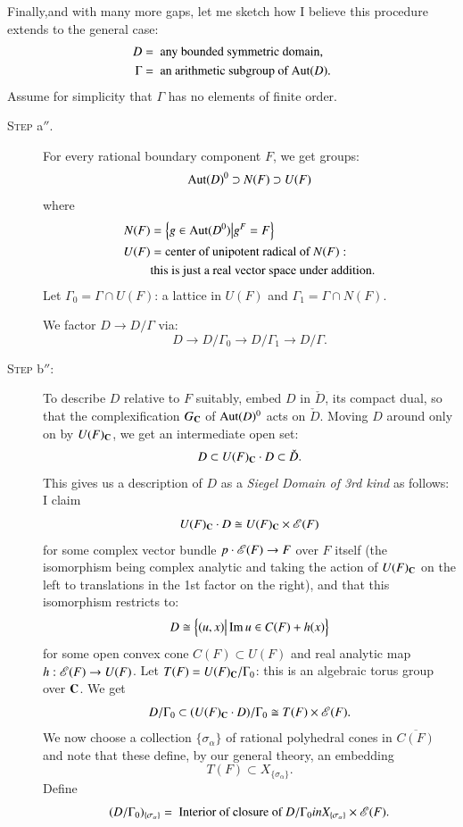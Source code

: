 \section{}\label{art8-sec3}
Finally,\pageoriginale and with many more gaps, let me sketch how I believe this procedure extends to the general case:
\begin{align*}
D & = \text{ any bounded symmetric domain,}\\
\Gamma & = \text{ an arithmetic subgroup of $\operatorname{Aut}(D)$.}
\end{align*}
Assume for simplicity that $\Gamma$ has no elements of finite order.
\begin{description}
\item[\textsc{Step} a$''$.] For every rational boundary component $F$, we get groups:
$$
\operatorname{Aut} (D)^0 \supset N(F) \supset U (F)
$$
where
\begin{align*}
N(F) & = \left\{ g \in \operatorname{Aut} (D^0) \big| g^F = F \right\}\\
U(F) & = \text{center of unipotent radical of } N(F):\\
& \text{this is just a real vector space under addition.}
\end{align*}
Let $\Gamma_0 = \Gamma \cap U (F)$: a lattice in $U(F)$ and $\Gamma_1 = \Gamma \cap N (F)$.

We  factor $D \longrightarrow D / \Gamma$ via:
$$
D \longrightarrow D / \Gamma_0 \longrightarrow D/ \Gamma_1 \longrightarrow D/ \Gamma.
$$

\item[\textsc{Step} b$''$:] To describe $D$ relative to $F$ suitably, embed $D$ in $\check{D}$, its compact dual, so that the complexification $G_{\mathbf{C}}$ of $\operatorname{Aut} (D)^0$ acts on $\check{D}$. Moving $D$ around only on by $U(F)_{\mathbf{C}}$, we get an intermediate open set:
$$
D \subset U (F)_{\mathbf{C}} \cdot D \subset \check{D}.
$$
This gives us a description of $D$ as a \textit{Siegel Domain of 3rd kind} as follows: I claim
$$
U (F)_{\mathbf{C}} \cdot D \cong U (F)_{\mathbf{C}} \times \mathscr{E} (F)
$$
for some complex vector bundle $p \cdot \mathscr{E} (F) \to F$ over $F$ itself (the isomorphism being complex analytic and taking the action of $U(F)_{\mathbf{C}}$ on the left to translations in the 1st factor on the right), and that this isomorphism restricts to:
$$
D \cong \left\{(u, x) \big| \operatorname{Im} u \in C (F) + h (x) \right\}
$$
for some open convex cone $C(F) \subset U (F)$ and real analytic map $h : \mathscr{E} (F) \to U (F)$. Let $T (F) = U (F)_{\mathbf{C}}/ \Gamma_0$: this is an algebraic torus group over $\mathbf{C}$. We get
$$
D / \Gamma_0 \subset (U (F)_{\mathbf{C}} \cdot D) / \Gamma_0 \cong T (F) \times \mathscr{E} (F).
$$\pageoriginale 
We now choose a collection $\{\sigma_\alpha\}$ of rational polyhedral cones in $\overline{C(F)}$ and note that these define, by our general theory, an embedding
$$
T (F) \subset X_{\{\sigma_\alpha\}}.
$$
Define
$$
(D/\Gamma_0)_{\{\sigma_\alpha\}} = \text{ Interior of closure of } D/ \Gamma_0 in X_{\{\sigma_\alpha\}} \times \mathscr{E} (F).
$$


\end{description}
